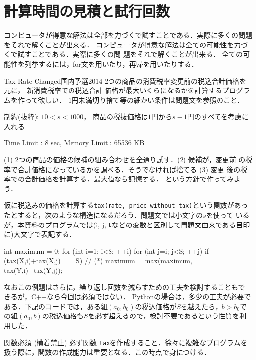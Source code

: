 \section{計算時間の見積と試行回数}

コンピュータが得意な解法は全部を力づくで試すことである．実際に多くの問題をそれで解くことが出来る．
コンピュータが得意な解法は全ての可能性を力づくで試すことである．実際に多くの問
題をそれで解くことが出来る．
全ての可能性を列挙するには，for文を用いたり，再帰を用いたりする．

\begin{pbox}{Tax Rate Changed}{国内予選2014}
2つの商品の消費税率変更前の税込合計価格を元に， 新消費税率での税込合計
価格が最大いくらになるかを計算するプログラムを作って欲しい． 1円未満切り捨て等の細かい条件は問題文を参照のこと． 

制約(抜粋): $10 < s < 1000$， 商品の税抜価格は$1$円から$s-1$円のすべてを考慮に入れる

Time Limit : 8 sec, Memory Limit : 65536 KB

\end{pbox}

 (1) 2つの商品の価格の候補の組み合わせを全通り試す．(2) 候補が，変更前
の税率で合計価格になっているかを調べる．そうでなければ捨てる (3) 変更
後の税率での合計価格を計算する．最大値なら記憶する．
という方針で作ってみよう．

仮に税込みの価格を計算する\texttt{tax(rate, price\_without\_tax)}という関数があっ
たとすると，次のような構造になるだろう．問題文では小文字の$s$を使って
いるが，本資料のプログラムでは(i, j, kなどの変数と区別して問題文由来である目印に)大文字で表記する．
\begin{cbox}
  int maximum = 0;
  for (int i=1; i<S; ++i)
    for (int j=i; j<S; ++j) 
      if (tax(X,i)+tax(X,j) == S) // (*)
        maximum = max(maximum, tax(Y,i)+tax(Y,j));
\end{cbox}
なおこの例題はさらに，繰り返し回数を減らすための工夫を検討することもで
きるが，C++なら今回は必須ではない．
Pythonの場合は，多少の工夫が必要である．下記のコードでは，ある組$(a_0,b_0)$の税込価格が$S$を越えたら，$b>b_0$での組$(a_0,b)$の税込価格も$S$を必ず超えるので，検討不要であるという性質を利用した．

\begin{warningbox}{関数必須 (横着禁止)}
  必ず関数 \texttt{tax}を作成すること．徐々に複雑なプログラムを扱う際に，関数の作成能力は重要となる．この時点で身につける．
\end{warningbox}

